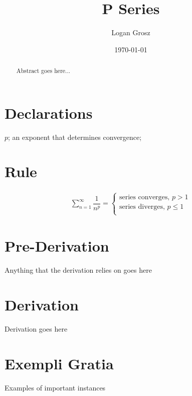 \documentclass{article}
\begin{document}
	
\author{Logan Grosz}
\title{P Series}
\date{\today}

\maketitle

\begin{abstract}
	Abstract goes here...
\end{abstract}

\section{Declarations}

$p$; an exponent that determines convergence;

\section{Rule}

\begin{gather}
	\sum_{n=1}^{\infty}\dfrac{1}{n^p}=
	\begin{cases}
		\text{series converges, }p > 1\\
		\text{series diverges, }p \leq 1\\
	\end{cases}
\end{gather}

\section{Pre-Derivation}
Anything that the derivation relies on goes here

\section{Derivation}

Derivation goes here

\section{Exempli Gratia}

Examples of important instances
\end{document}
